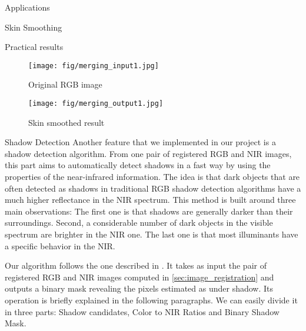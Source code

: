 \documentclass[10pt]{article}
\begin{document}
\begin{section}{Applications}
\begin{subsection}{Skin Smoothing}
\begin{subsubsection}{Practical results}
            \begin{figure}[!h]
                \centering
                \begin{minipage}[b]{0.48\textwidth}
                    \texttt{[image: fig/merging\_input1.jpg]}
                    \caption{Original RGB image}
                    \label{fig:merging_practical1}
                \end{minipage} \hspace{0.5em} %
                \begin{minipage}[b]{0.48\textwidth}
                    \texttt{[image: fig/merging\_output1.jpg]}
                    \caption{Skin smoothed result}
                    \label{fig:merging_practical2}
                \end{minipage} \hspace{0.5em} %

            \end{figure}

        \end{subsubsection}
    \end{subsection}

    \newpage

    \begin{subsection}{Shadow Detection}
        \label{sec:shadow_detection}
        Another feature that we implemented in our project is a shadow detection algorithm. From one pair of registered RGB and NIR images, this part aims to automatically detect shadows in a fast way by using the properties of the near-infrared information. The idea is that dark objects that are often detected as shadows in traditional RGB shadow detection algorithms have a much higher reflectance in the NIR spectrum. This method is built around three main observations: The first one is that shadows are generally darker than their surroundings. Second, a considerable number of dark objects in the visible spectrum are brighter in the NIR one. The last one is that most illuminants have a specific behavior in the NIR.

        \medskip

        Our algorithm follows the one described in \cite{shadow}. It takes as input the pair of registered RGB and NIR images computed in \ref{sec:image_registration} and outputs a binary mask revealing the pixels estimated as under shadow. Its operation is briefly explained in the following paragraphs. We can easily divide it in three parts: Shadow candidates, Color to NIR Ratios and Binary Shadow Mask.


\end{subsection}
\end{section}
\end{document}
